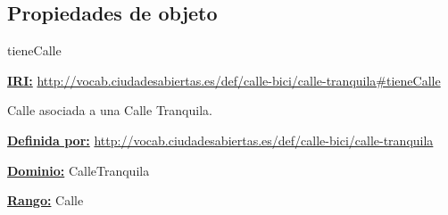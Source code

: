 \subsection{Propiedades de objeto}



\begin{mybox}{tieneCalle}
\begin{flushleft}
\underline{\textbf{IRI:}}
\url{http://vocab.ciudadesabiertas.es/def/calle-bici/calle-tranquila#tieneCalle}
\newline

Calle asociada a una Calle Tranquila.
\newline

\underline{\textbf{Definida por:}}
\url{http://vocab.ciudadesabiertas.es/def/calle-bici/calle-tranquila}
\newline

\underline{\textbf{Dominio:}}
		CalleTranquila
\newline

\underline{\textbf{Rango:}}
		Calle
\newline


\end{flushleft}
\end{mybox}



